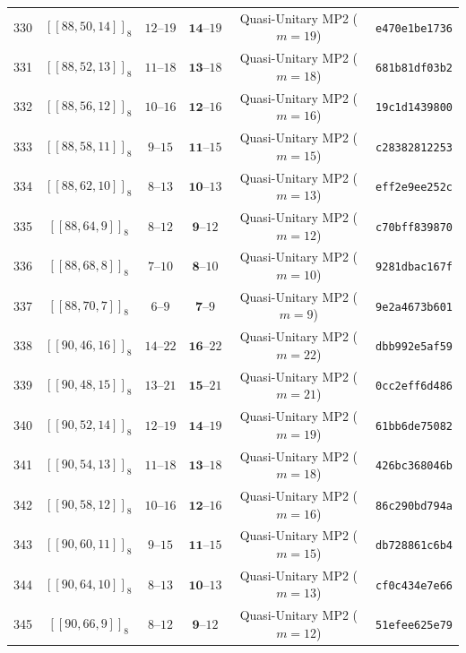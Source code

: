 \documentclass[11pt,a4paper]{article}
\theoremstyle{remark}
\begin{document}
{\begin{longtable}{@{}rccccl@{}}
330 & $[[88,50,14]]_{8}$ & $12\text{--}19$ & $\mathbf{14}\text{--}19$ & Quasi-Unitary MP2 ($m=19$) & \texttt{e470e1be1736} \\
331 & $[[88,52,13]]_{8}$ & $11\text{--}18$ & $\mathbf{13}\text{--}18$ & Quasi-Unitary MP2 ($m=18$) & \texttt{681b81df03b2} \\
332 & $[[88,56,12]]_{8}$ & $10\text{--}16$ & $\mathbf{12}\text{--}16$ & Quasi-Unitary MP2 ($m=16$) & \texttt{19c1d1439800} \\
333 & $[[88,58,11]]_{8}$ & $9\text{--}15$ & $\mathbf{11}\text{--}15$ & Quasi-Unitary MP2 ($m=15$) & \texttt{c28382812253} \\
334 & $[[88,62,10]]_{8}$ & $8\text{--}13$ & $\mathbf{10}\text{--}13$ & Quasi-Unitary MP2 ($m=13$) & \texttt{eff2e9ee252c} \\
335 & $[[88,64,9]]_{8}$ & $8\text{--}12$ & $\mathbf{9}\text{--}12$ & Quasi-Unitary MP2 ($m=12$) & \texttt{c70bff839870} \\
336 & $[[88,68,8]]_{8}$ & $7\text{--}10$ & $\mathbf{8}\text{--}10$ & Quasi-Unitary MP2 ($m=10$) & \texttt{9281dbac167f} \\
337 & $[[88,70,7]]_{8}$ & $6\text{--}9$ & $\mathbf{7}\text{--}9$ & Quasi-Unitary MP2 ($m=9$) & \texttt{9e2a4673b601} \\
338 & $[[90,46,16]]_{8}$ & $14\text{--}22$ & $\mathbf{16}\text{--}22$ & Quasi-Unitary MP2 ($m=22$) & \texttt{dbb992e5af59} \\
339 & $[[90,48,15]]_{8}$ & $13\text{--}21$ & $\mathbf{15}\text{--}21$ & Quasi-Unitary MP2 ($m=21$) & \texttt{0cc2eff6d486} \\
340 & $[[90,52,14]]_{8}$ & $12\text{--}19$ & $\mathbf{14}\text{--}19$ & Quasi-Unitary MP2 ($m=19$) & \texttt{61bb6de75082} \\
341 & $[[90,54,13]]_{8}$ & $11\text{--}18$ & $\mathbf{13}\text{--}18$ & Quasi-Unitary MP2 ($m=18$) & \texttt{426bc368046b} \\
342 & $[[90,58,12]]_{8}$ & $10\text{--}16$ & $\mathbf{12}\text{--}16$ & Quasi-Unitary MP2 ($m=16$) & \texttt{86c290bd794a} \\
343 & $[[90,60,11]]_{8}$ & $9\text{--}15$ & $\mathbf{11}\text{--}15$ & Quasi-Unitary MP2 ($m=15$) & \texttt{db728861c6b4} \\
344 & $[[90,64,10]]_{8}$ & $8\text{--}13$ & $\mathbf{10}\text{--}13$ & Quasi-Unitary MP2 ($m=13$) & \texttt{cf0c434e7e66} \\
345 & $[[90,66,9]]_{8}$ & $8\text{--}12$ & $\mathbf{9}\text{--}12$ & Quasi-Unitary MP2 ($m=12$) & \texttt{51efee625e79} \\

\end{longtable}}
\end{document}

